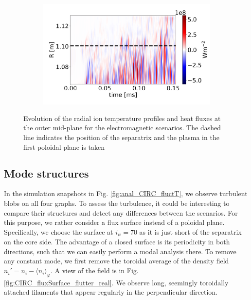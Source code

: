 \begin{figure}[H]
\begin{subfigure}[t]{0.45\textwidth}
	\end{subfigure}
	\begin{subfigure}[t]{0.45\textwidth}
		\centering
		\includegraphics[width=1\textwidth]{schemes/plotOMPtime_spec1_fluxE_psi_flutter.jpg}
	\end{subfigure}
	\caption[Evolution of the radial ion temperature profiles and heat fluxes at the outer mid-plane for the electromagnetic scenarios]{Evolution of the radial ion temperature profiles and heat fluxes at the outer mid-plane for the electromagnetic scenarios. The dashed line indicates the position of the separatrix and the plasma in the first poloidal plane is taken}
	\label{fig:CIRC_EM_OMPevolution}
\end{figure}



\subsection{Mode structures}

In the simulation snapshots in Fig. \ref{fig:anal_CIRC_fluctT}, we observe turbulent blobs on all four graphs. To assess the turbulence, it could be interesting to compare their structures and detect any differences between the scenarios. For this purpose, we rather consider a flux surface instead of a poloidal plane. Specifically, we choose the surface at $i_\psi=70$ as it is just short of the separatrix on the core side. The advantage of a closed surface is its periodicity in both directions, such that we can easily perform a modal analysis there. To remove any constant mode, we first remove the toroidal average of the density field $n_i' = n_i-\langle n_i\rangle_\varphi$. A view of the field is in Fig. \ref{fig:CIRC_fluxSurface_flutter_real}. We observe long, seemingly toroidally attached filaments that appear regularly in the perpendicular direction. \newline 

